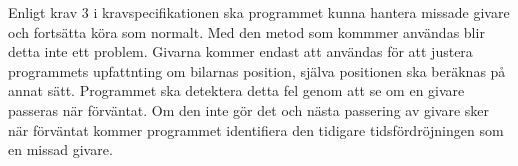 Enligt krav 3 i kravspecifikationen ska programmet kunna hantera missade givare
och fortsätta köra som normalt. Med den metod som kommmer användas blir detta inte ett problem.
Givarna kommer endast att användas för att justera programmets upfattnting om bilarnas position, 
själva positionen ska beräknas på annat sätt.  Programmet ska detektera detta
fel genom att  se om en givare passeras när förväntat. Om den inte gör det och nästa
passering av givare sker när förväntat kommer programmet
identifiera den tidigare tidsfördröjningen som en missad givare.
